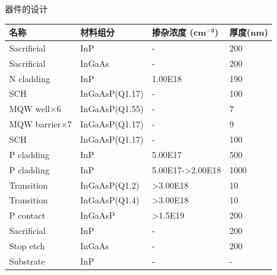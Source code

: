 \documentclass{beamer}
\begin{document}
\begin{frame}{器件的设计}
{
\begin{table}[h]
	\centering
	\begin{tabular}[t]{|llll|}
		\hline
		\textbf{名称} & \textbf{材料组分} & \textbf{掺杂浓度 ($\pmb{cm^{-3}}$)} & \textbf{厚度($\pmb{nm}$)} \\
		\hline
		Sacrificial & InP & - &  200 \\
		\hline 
		Sacrificial & InGaAs & - &  200 \\
		\hline
		N cladding & InP & 1.00E18 & 190 \\
		\hline
		SCH & InGaAsP(Q1.17) & - & 100 \\
		\hline
		MQW well$\times$6 & InGaAsP(Q1.55) & - & 7 \\
		\hline
		MQW barrier$\times$7 & InGaAsP(Q1.17) & - & 9 \\
		\hline
		SCH & InGaAsP(Q1.17) & - & 100 \\
		\hline
		P cladding & InP & 5.00E17 & 500 \\
		\hline 
		P cladding & InP & 5.00E17->2.00E18 & 1000\\
		\hline
		Transition & InGaAsP(Q1.2) & >3.00E18 & 10\\
		\hline
		Transition & InGaAsP(Q1.4) & >3.00E18 & 10\\
		\hline
		P contact & InGaAsP & >1.5E19 & 200 \\
		\hline
		Sacrificial & InP & - & 200 \\
		\hline
		Stop etch & InGaAs & - & 200 \\
		\hline
		Substrate & InP & - & -\\
		\hline
	\end{tabular}
\end{table}}

\end{frame}
\end{document}
